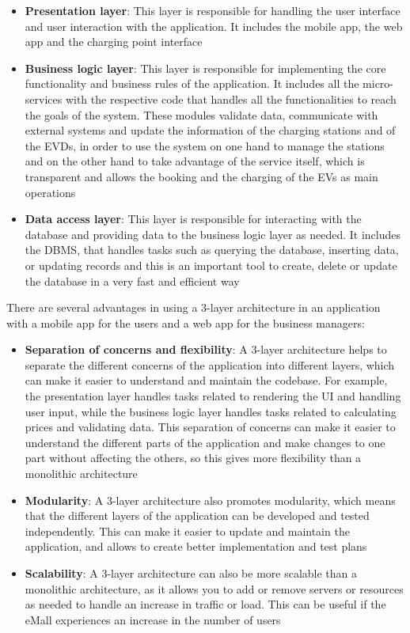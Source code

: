 \begin{itemize}
    \item \textbf{Presentation layer}: This layer is responsible for handling the user interface and user interaction with the application. It includes the mobile app, the web app and the charging point interface
    \item \textbf{Business logic layer}: This layer is responsible for implementing the core functionality and business rules of the application. It includes all the micro-services with the respective code that handles all the functionalities to reach the goals of the system. These modules validate data, communicate with external systems and update the information of the charging stations and of the EVDs, in order to use the system on one hand to manage the stations and on the other hand to take advantage of the service itself, which is transparent and allows the booking and the charging of the EVs as main operations
    \item \textbf{Data access layer}: This layer is responsible for interacting with the database and providing data to the business logic layer as needed. It includes the DBMS, that handles tasks such as querying the database, inserting data, or updating records and this is an important tool to create, delete or update the database in a very fast and efficient way
\end{itemize}
\vspace{0.8cm}
There are several advantages in using a 3-layer architecture in an application with a mobile app for the users and a web app for the business managers:
\begin{itemize}
    \item \textbf{Separation of concerns and flexibility}: A 3-layer architecture helps to separate the different concerns of the application into different layers, which can make it easier to understand and maintain the codebase. For example, the presentation layer handles tasks related to rendering the UI and handling user input, while the business logic layer handles tasks related to calculating prices and validating data. This separation of concerns can make it easier to understand the different parts of the application and make changes to one part without affecting the others, so this gives more flexibility than a monolithic architecture
    \item \textbf{Modularity}: A 3-layer architecture also promotes modularity, which means that the different layers of the application can be developed and tested independently. This can make it easier to update and maintain the application, and allows to create better implementation and test plans
    \item \textbf{Scalability}: A 3-layer architecture can also be more scalable than a monolithic architecture, as it allows you to add or remove servers or resources as needed to handle an increase in traffic or load. This can be useful if the eMall experiences an increase in the number of users
\end{itemize}

